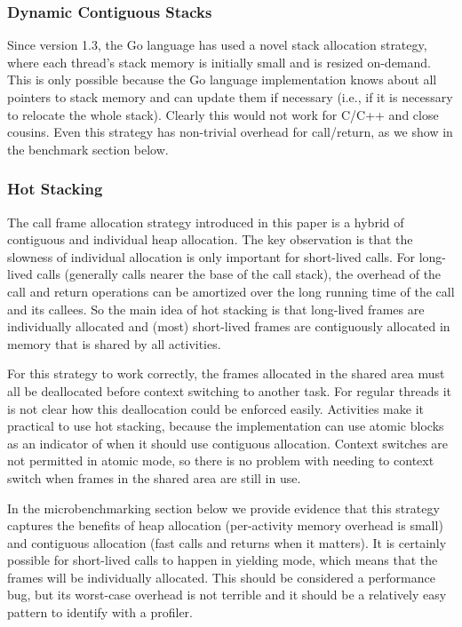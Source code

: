 \documentclass[preprint, 10pt, numbers]{sigplanconf}
\begin{document}

\subsubsection{Dynamic Contiguous Stacks}

Since version 1.3, the Go language has used a novel stack allocation strategy, where each thread's stack memory is initially small and is resized on-demand.
This is only possible because the Go language implementation knows about all pointers to stack memory and can update them if necessary (i.e., if it is necessary to relocate the whole stack).
Clearly this would not work for C/C++ and close cousins.
Even this strategy has non-trivial overhead for call/return, as we show in the benchmark section below.

\subsubsection{Hot Stacking}

The call frame allocation strategy introduced in this paper is a hybrid of contiguous and individual heap allocation.
The key observation is that the slowness of individual allocation is only important for short-lived calls.
For long-lived calls (generally calls nearer the base of the call stack), the overhead of the call and return operations can be amortized over the long running time of the call and its callees.
So the main idea of hot stacking is that long-lived frames are individually allocated and (most) short-lived frames are contiguously allocated in memory that is shared by all activities.

For this strategy to work correctly, the frames allocated in the shared area must all be deallocated before context switching to another task.
For regular threads it is not clear how this deallocation could be enforced easily.
Activities make it practical to use hot stacking, because the implementation can use atomic blocks as an indicator of when it should use contiguous allocation.
Context switches are not permitted in atomic mode, so there is no problem with needing to context switch when frames in the shared area are still in use.

In the microbenchmarking section below we provide evidence that this strategy captures the benefits of heap allocation (per-activity memory overhead is small) and contiguous allocation (fast calls and returns when it matters).
It is certainly possible for short-lived calls to happen in yielding mode, which means that the frames will be individually allocated.
This should be considered a performance bug, but its worst-case overhead is not terrible and it should be a relatively easy pattern to identify with a profiler.
\end{document}
